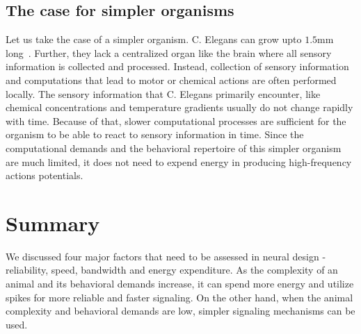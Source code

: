 \documentclass[10pt,onecolumn]{article}
\begin{document}
    \subsection*{The case for simpler organisms}
    \label{sec:the_case_for_simpler_organisms}
    Let us take the case of a simpler organism.
    C. Elegans can grow upto $1.5$mm long~\cite{riddle1997introduction}.
    Further, they lack a centralized organ like the brain where all sensory information is collected and processed.
    Instead, collection of sensory information and computations that lead to motor or chemical actions are often performed locally.
    The sensory information that C. Elegans primarily encounter, like chemical concentrations and temperature gradients usually do not change rapidly with time.
    Because of that, slower computational processes are sufficient for the organism to be able to react to sensory information in time.
    Since the computational demands and the behavioral repertoire of this simpler organism are much limited, it does not need to expend energy in producing high-frequency actions potentials.

    \section*{Summary}
    \label{sec:summary}
    We discussed four major factors that need to be assessed in neural design - reliability, speed, bandwidth and energy expenditure.
    As the complexity of an animal and its behavioral demands increase, it can spend more energy and utilize spikes for more reliable and faster signaling.
    On the other hand, when the animal complexity and behavioral demands are low, simpler signaling mechanisms can be used.

    \setlength{\bibsep}{2pt}
    
    \footnotesize
    
\end{document}
